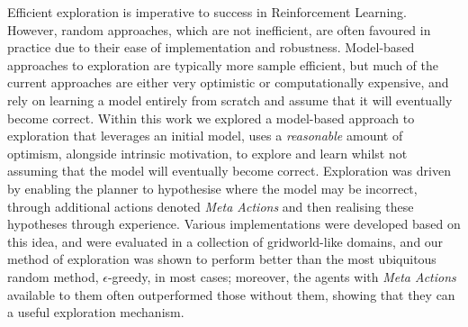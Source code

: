 Efficient exploration is imperative to success in Reinforcement Learning. However, random approaches, which are not inefficient, are often favoured in practice due to their ease of implementation and robustness. Model-based approaches to exploration are typically more sample efficient, but much of the current approaches are either very optimistic or computationally expensive, and rely on learning a model entirely from scratch and assume that it will eventually become correct.
\newline\newline Within this work we explored a model-based approach to exploration that leverages an initial model, uses a \textit{reasonable} amount of optimism, alongside intrinsic motivation, to explore and learn whilst not assuming that the model will eventually become correct. Exploration was driven by enabling the planner to hypothesise where the model may be incorrect, through additional actions denoted \textit{Meta Actions} and then realising these hypotheses through experience.
\newline\newline Various implementations were developed based on this idea, and were evaluated in a collection of gridworld-like domains, and our method of exploration was shown to perform better than the most ubiquitous random method, $\epsilon$-greedy, in most cases; moreover, the agents with \textit{Meta Actions} available to them often outperformed those without them, showing that they can a useful exploration mechanism.